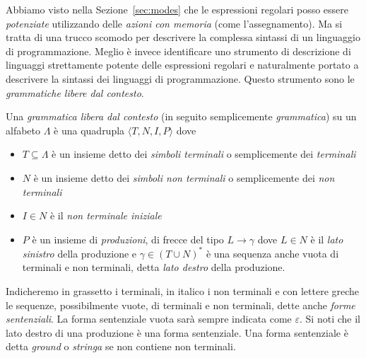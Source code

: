 Abbiamo visto nella Sezione~\ref{sec:modes} che le espressioni regolari
posso essere \emph{potenziate} utilizzando delle \emph{azioni con memoria}
(come l'assegnamento). Ma si tratta di una trucco scomodo per descrivere
la complessa sintassi di un linguaggio di programmazione. Meglio \`e invece
identificare uno strumento di descrizione di linguaggi strettamente \piu
potente delle espressioni regolari e naturalmente portato a descrivere la
sintassi dei linguaggi di programmazione. Questo strumento sono le
\emph{grammatiche libere dal contesto}.
%
\begin{definition}\label{def:grammar}
Una \emph{grammatica libera dal contesto} (in seguito semplicemente
\emph{grammatica}) su un alfabeto $\Lambda$
\`e una quadrupla $\langle T,N,I,P\rangle$ dove
\begin{itemize}
\item $T\subseteq\Lambda$
      \`e un insieme detto dei \emph{simboli terminali} o semplicemente
      dei \emph{terminali}
\item $N$ \`e un insieme
      detto dei \emph{simboli non terminali} o semplicemente
      dei \emph{non terminali}
\item $I\in N$ \`e il \emph{non terminale iniziale}
\item $P$ \`e un insieme di \emph{produzioni}, \cioe di frecce del tipo
      $L\to\gamma$ dove $L\in N$ \`e il \emph{lato sinistro} della produzione
      e $\gamma\in (T\cup N)^*$ \`e una sequenza anche vuota di terminali e
      non terminali, detta \emph{lato destro} della produzione.
\end{itemize}
%
Indicheremo in grassetto i terminali, in italico
i non terminali e con lettere greche le sequenze, possibilmente vuote,
di terminali e non terminali, dette anche \emph{forme sentenziali}.
La forma sentenziale vuota sar\`a sempre indicata come $\varepsilon$. Si noti
che il lato destro di una produzione \`e una forma sentenziale.
Una forma sentenziale \`e detta \emph{ground} o \emph{stringa}
se non contiene non terminali.
\end{definition}

